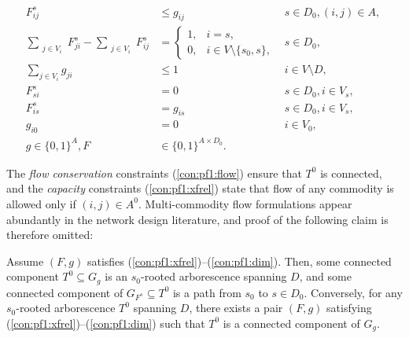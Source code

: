 \begin{subequations}
\begin{align}
\label{con:pf1:xfrel} F^{s}_{ij} & \leq g_{ij} & s\in D_0, (i,j)\in A, \\
\label{con:pf1:flow} \sum\limits_{\substack{ j \in V_i }}F^{s}_{ji}-\sum\limits_{\substack{j\in V_i}}F^{s}_{ij} &= 
  \begin{cases}
    1, & i=s,\\
    0, & i\in V\setminus \{s_0, s\},
  \end{cases} & s\in D_0,\\
\label{con:pf1:B}  \sum_{j\in V_i}g_{ji}&\leq 1 & i\in V\setminus D,\\
\label{con:pf1:noflowFromT} F_{si}^s&=0 & s\in D_0, i\in V_s,\\
\label{con:pf1:fitt=xit} F_{is}^s&=g_{is} & s\in D_0, i\in V_s,\\
\label{con:pf1:xi0=0} g_{i0}&=0 & i\in V_0,\\
\label{con:pf1:dim}g \in \{0,1\}^{A},F&\in\{0,1\}^{A \times D_0}.
\end{align}~
\end{subequations}

The \emph{flow conservation} constraints (\ref{con:pf1:flow}) ensure that $T^0$ is connected,
and the \emph{capacity} constraints (\ref{con:pf1:xfrel}) state that flow of any commodity is allowed only if $(i,j)\in A^0$.
Multi-commodity flow formulations appear abundantly in the network design literature, and proof of the following claim is therefore omitted:

\begin{lemma}
\label{lem:modelcorrect}
Assume $(F,g)$ satisfies (\ref{con:pf1:xfrel})--(\ref{con:pf1:dim}).
Then, some connected component $T^0\subseteq G_{g}$ is an $s_0$-rooted arborescence spanning $D$,
and some connected component of $G_{F^s}\subseteq T^0$ is a path from $s_0$ to $s\in D_0$.
Conversely, for any $s_0$-rooted arborescence $T^0$ spanning $D$, there exists a pair $(F,g)$ satisfying (\ref{con:pf1:xfrel})--(\ref{con:pf1:dim}) such that $T^0$
is a connected component of $G_g$.
\end{lemma}
 
